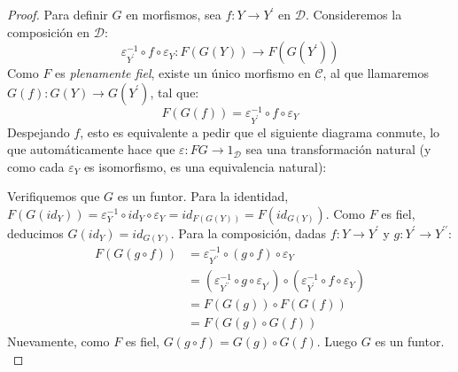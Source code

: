 \documentclass{article}
\theoremstyle{plain}
\theoremstyle{definition}
\theoremstyle{remark}
\begin{document}
\begin{proof}
    Para definir $G$ en morfismos, sea $f: Y \to Y^\prime$ en $\mathcal{D}$. Consideremos la composición en $\mathcal{D}$:
    \begin{equation*}
        \varepsilon_{Y^\prime}^{-1} \circ f \circ \varepsilon_Y: F(G(Y)) \longrightarrow F(G(Y^\prime))
    \end{equation*}
    Como $F$ es \textit{plenamente fiel}, existe un único morfismo en $\mathcal{C}$, al que llamaremos $G(f): G(Y) \to G(Y^\prime)$, tal que:
    \begin{equation*}
        F(G(f)) = \varepsilon_{Y^\prime}^{-1} \circ f \circ \varepsilon_Y
    \end{equation*}
    Despejando $f$, esto es equivalente a pedir que el siguiente diagrama conmute, lo que automáticamente hace que $\varepsilon: FG \to 1_{\mathcal{D}}$ sea una transformación natural (y como cada $\varepsilon_Y$ es isomorfismo, es una equivalencia natural):
    
    \begin{center}
    \end{center}

    Verifiquemos que $G$ es un funtor. Para la identidad, $F(G(id_Y)) = \varepsilon_Y^{-1} \circ id_Y \circ \varepsilon_Y = id_{F(G(Y))} = F(id_{G(Y)})$. Como $F$ es fiel, deducimos $G(id_Y) = id_{G(Y)}$. 
    Para la composición, dadas $f: Y \to Y^\prime$ y $g: Y^\prime \to Y^{\prime\prime}$:
    \begin{align*}
        F(G(g \circ f)) &= \varepsilon_{Y^{\prime\prime}}^{-1} \circ (g \circ f) \circ \varepsilon_Y \\
        &= (\varepsilon_{Y^{\prime\prime}}^{-1} \circ g \circ \varepsilon_{Y^\prime}) \circ (\varepsilon_{Y^\prime}^{-1} \circ f \circ \varepsilon_Y) \\
        &= F(G(g)) \circ F(G(f)) \\
        &= F(G(g) \circ G(f))
    \end{align*}
    Nuevamente, como $F$ es fiel, $G(g \circ f) = G(g) \circ G(f)$. Luego $G$ es un funtor. \\


\end{proof}
\end{document}
